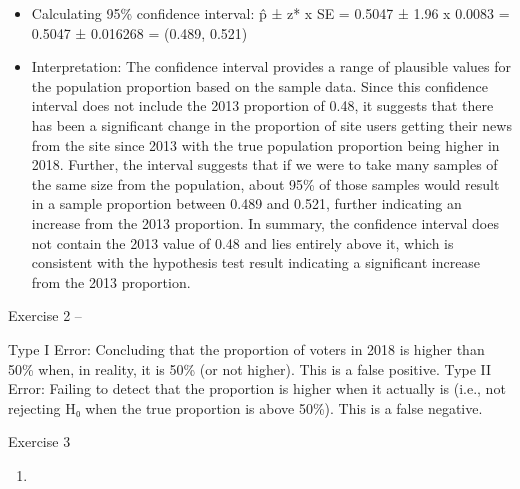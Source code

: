 \documentclass[
]{article}
\providecommand{\tightlist}{%
  \setlength{\itemsep}{0pt}\setlength{\parskip}{0pt}}
\begin{document}
\begin{itemize}
\item
  Calculating 95\% confidence interval: p̂ ± z* x SE = 0.5047 ± 1.96 x
  0.0083 = 0.5047 ± 0.016268 = (0.489, 0.521)
\item
  Interpretation: The confidence interval provides a range of plausible
  values for the population proportion based on the sample data. Since
  this confidence interval does not include the 2013 proportion of 0.48,
  it suggests that there has been a significant change in the proportion
  of site users getting their news from the site since 2013 with the
  true population proportion being higher in 2018. Further, the interval
  suggests that if we were to take many samples of the same size from
  the population, about 95\% of those samples would result in a sample
  proportion between 0.489 and 0.521, further indicating an increase
  from the 2013 proportion. In summary, the confidence interval does not
  contain the 2013 value of 0.48 and lies entirely above it, which is
  consistent with the hypothesis test result indicating a significant
  increase from the 2013 proportion.
\end{itemize}

Exercise 2 --

Type I Error: Concluding that the proportion of voters in 2018 is higher
than 50\% when, in reality, it is 50\% (or not higher). This is a false
positive. Type II Error: Failing to detect that the proportion is higher
when it actually is (i.e., not rejecting H₀ when the true proportion is
above 50\%). This is a false negative.

Exercise 3

\begin{enumerate}
\def\labelenumi{(\alph{enumi})}
\tightlist
\item
\end{enumerate}
\end{document}
